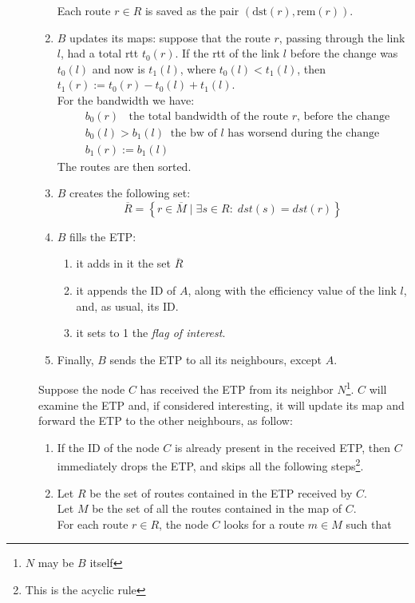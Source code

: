 \documentclass[a4paper]{article}
\newcommand{\T}[1]{\textrm{#1}}
\newcommand{\pgra}[1]{\left\{#1\right\}}
\def\ove#1{{\overline{#1}}}
\begin{document}
\begin{description}
\begin{enumerate}
			Each route $r\in R$ is saved as the pair $(\T{dst}(r),
			\T{rem}(r))$.
		\item \label{upmap}
			$B$ updates its maps:
			suppose that the route $r$, passing through the link
			$l$, had a total rtt $t_0(r)$. If the rtt of the link
			$l$ before the change was $t_0(l)$ and now is
			$t_1(l)$, where $t_0(l) < t_1(l)$, then
			$t_1(r):=t_0(r)-t_0(l)+t_1(l)$.\\
			For the bandwidth we have:
			\begin{align*}
				&b_0(r)\;\;\T{ the total bandwidth of the
				route $r$, before the change}\\
				&b_0(l) > b_1(l)\;\;\T{the bw of $l$ has
				worsend during the change}\\
				&b_1(r):=b_1(l)
			\end{align*}
			The routes are then sorted.
		\item $B$ creates the following set:
			\[
			\ove R = \pgra{r\in \ove M\;|\;\exists s\in R:\;dst(s)=dst(r)}
			\]
		\item $B$ fills the ETP: 
			\begin{enumerate}
				\item it adds in it the set $\ove R$
				\item it appends the ID of $A$, along with the efficiency
					value of the link $l$, and, as usual, its ID.
				\item it sets to 1 the \emph{flag of interest}.
			\end{enumerate}
		\item Finally, $B$ sends the ETP to all its neighbours, except $A$.
		\end{enumerate}
		\label{ETPrule1}
		Suppose the node $C$ has received the ETP from its neighbor
		$N$\footnote{$N$ may be $B$ itself}.
		$C$ will examine the ETP and, if considered interesting, it 
	will update its map and forward the ETP to the other neighbours, as
		follow:
		\begin{enumerate}
		\item If the ID of the node $C$ is already present in the
			received ETP, then $C$ immediately drops the ETP, and
			skips all the following steps\footnote{This is the acyclic
			rule}.
		\item Let $R$ be the set of routes contained in the
			ETP received by $C$.\\
			Let $M$ be the set of all the routes contained in the map of $C$.\\
		For each route $r\in R$, the node $C$ looks for 
		a route $m\in M$ such that 

\end{enumerate}
\end{description}
\end{document}
